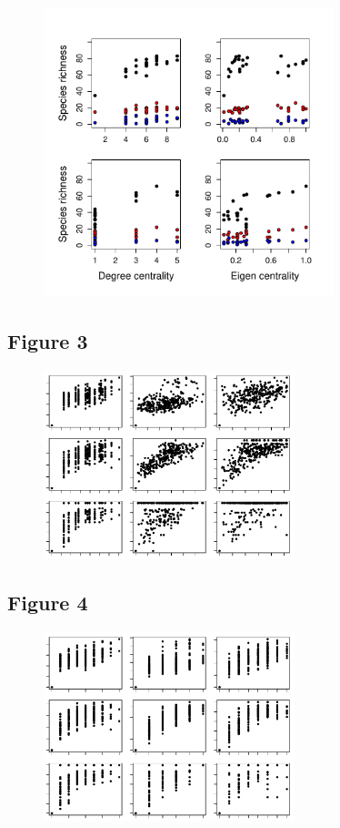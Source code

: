 \documentclass[12pt]{article}
\begin{document}
\begin{figure}[ht!]
	\centering\includegraphics[width=0.75\textwidth]{Centrality.pdf}
\end{figure}

\newpage

\subsection*{Figure 3}

\begin{figure}[ht!]
	\centering\includegraphics[width=0.65\textwidth]{BetaGeoDist.pdf}
\end{figure}

\newpage

\subsection*{Figure 4}

\begin{figure}[ht!]
	\centering\includegraphics[width=0.65\textwidth]{BetaTopoDist.pdf}
\end{figure}

\newpage
\end{document}
